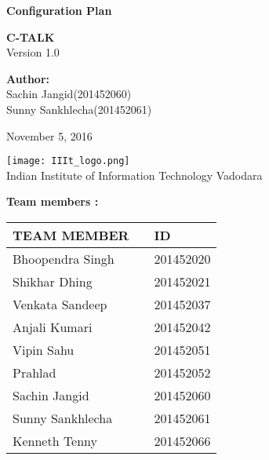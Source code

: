 \documentclass[12pt]{article}
\def\mydate{November 5, 2016}
\begin{document}
	
	\begin{titlepage}
		\begin{center}
			
			
			\LARGE{\textbf{Configuration Plan}}
			
			\vspace{1.5cm}
			
			\textbf{C-TALK}\\
			
			\small{Version 1.0}
			\vspace{2cm}
		 
        \large{\textbf{Author:}}
			  \large{ \\ Sachin Jangid(201452060) \\Sunny Sankhlecha(201452061)}	
			  
			  
			\vspace{1.5cm}
			\mydate{}
			
			
			\vspace{5cm}
			\texttt{[image: IIIt\_logo.png]} \\
			\Large{Indian Institute of Information Technology Vadodara} \\
			
		\end{center}
	\end{titlepage}
	\textbf{Team members :} \\
		\begin{center}
		
		\begin{tabular}{ |m{10em} m{8em} m{9em}|}
			\hline
			TEAM MEMBER          &   & ID        \\
			\hline
			Bhoopendra Singh     &   & 201452020 \\
			Shikhar Dhing        &   & 201452021 \\
			Venkata Sandeep      &   & 201452037 \\
			Anjali Kumari        &   & 201452042 \\
			Vipin Sahu           &   & 201452051 \\
			Prahlad              &   & 201452052 \\ 
			Sachin Jangid        &   & 201452060 \\
			Sunny Sankhlecha     &   & 201452061 \\
			Kenneth Tenny        &   & 201452066 \\
			\hline
		\end{tabular}
		
	\end{center}
	\vspace{2em}
	
\end{document}

